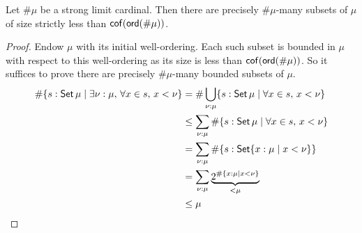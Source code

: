 \begin{lemma-no-bp}[mathlib]
  \label{prop:mk_subset_mk_lt_cof}
  Let \( \#\mu \) be a strong limit cardinal.
  Then there are precisely \( \#\mu \)-many subsets of \( \mu \) of size strictly less than \( \operatorname{\mathsf{cof}}(\operatorname{\mathsf{ord}}(\#\mu)) \).
\end{lemma-no-bp}
\begin{proof}
  Endow \( \mu \) with its initial well-ordering.
  Each such subset is bounded in \( \mu \) with respect to this well-ordering as its size is less than \( \operatorname{\mathsf{cof}}(\operatorname{\mathsf{ord}}(\#\mu)) \).
  So it suffices to prove there are precisely \( \#\mu \)-many bounded subsets of \( \mu \).
  \begin{align*}
    \#\{ s : \operatorname{\mathsf{Set}} \mu \mid \exists \nu : \mu,\, \forall x \in s,\, x < \nu \}
    &= \#\bigcup_{\nu : \mu} \{ s : \operatorname{\mathsf{Set}} \mu \mid \forall x \in s,\, x < \nu \} \\
    &\leq \sum_{\nu : \mu} \#\{ s : \operatorname{\mathsf{Set}} \mu \mid \forall x \in s,\, x < \nu \} \\
    &= \sum_{\nu : \mu} \#\{ s : \operatorname{\mathsf{Set}} \{ x : \mu \mid x < \nu \}\} \\
    &= \sum_{\nu : \mu} \underbrace{2^{\#\{ x : \mu \mid x < \nu \}}}_{<\mu} \\
    &\leq \mu
  \end{align*}
\end{proof}
